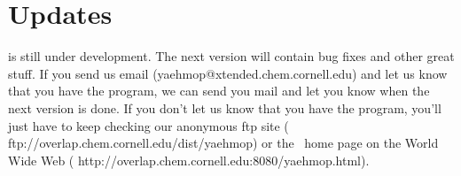 \chapter{Updates}

\prog is still under development.  The next version will contain bug fixes
and other great stuff.  If you send us 
email (yaehmop@xtended.chem.cornell.edu) and let us know that you have
the program, we can send you mail and let you know when the next
version is done.  If you don't let us know that you have the program,
you'll just have to keep checking our anonymous ftp site ({\sf
ftp://overlap.chem.cornell.edu/dist/yaehmop}) or the \prog\ home page
on the World Wide Web ({\sf
http://overlap.chem.cornell.edu:8080/yaehmop.html}). 
